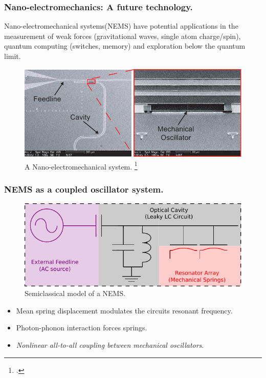 \documentclass[10pt,reqno]{beamer}
\begin{document}
\begin{frame}
\frametitle{Nano-electromechanics: A future technology.}
Nano-electromechanical systems(NEMS) have potential applications in the measurement of weak forces (gravitational waves, single atom charge/spin),
quantum computing (switches, memory) and exploration below the quantum limit.
\begin{figure}
\includegraphics[scale=0.35]{cavity.jpg}
\caption{A Nano-electromechanical system. \footcite{nanoimg}}
\end{figure}
\end{frame}
\begin{frame}
\frametitle{NEMS as a coupled oscillator system.}
\begin{figure}
\includegraphics[scale=0.7]{schem2.pdf}
\caption{Semiclassical model of a NEMS.}
\end{figure}
\begin{itemize}
\item Mean spring displacement modulates the circuits resonant frequency.
\item Photon-phonon interaction forces springs.
\item {\em Nonlinear all-to-all coupling between mechanical oscillators}.
\end{itemize}
\end{frame}
\end{document}
